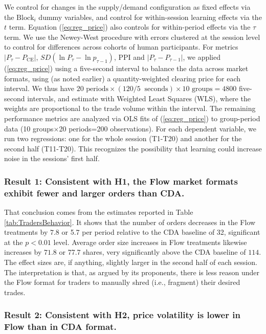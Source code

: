 \documentclass[12pt]{article}
\begin{document}
We control for changes in the supply/demand configuration as fixed effects via the $\text{Block}_i$ dummy variables,
and control for within-session learning effects via the $t$ term.
Equation (\ref{eq:reg_price}) also controls for within-period effects via the $\tau$ term. 
We use the Newey-West procedure with errors clustered at the session level to control for differences across cohorts of human participants.
For metrics $\lvert P_{\tau} - P_{\text{CE}}\rvert$, $SD\left(\ln P_{\tau} - \ln p_{{\tau} - 1}\right)$, PPI and $\lvert P_{{\tau}} - P_{{\tau} - 1}\rvert$, we applied (\ref{eq:reg_price}) using a five-second interval to balance the data across market formats, using (as noted earlier) a quantity-weighted clearing price for each interval. %
We thus have $20 \text{ periods} \times (120  / 5 \ \text{  seconds}) \times 10 \text{ groups}= 4800$ five-second intervals, and 
estimate with Weighted Least Squares (WLS), where the weights are proportional to the trade volume within the interval. 
The remaining performance metrics are analyzed via OLS fits of (\ref{eq:reg_price}) to group-period data (10 groups×20 periods=200 observations). 
For each dependent variable, we run two regressions: one for the whole session (T1-T20) and another for the second half (T11-T20). 
This recognizes the possibility that learning could increase noise in the sessions' first half. 


\subsubsection*{Result 1: 
Consistent with H1, the Flow market formats exhibit fewer and larger orders than CDA.}

That conclusion comes from the estimates reported in Table \ref{tab:TradersBehavior}.
It shows that the number of orders decreases in the Flow treatments by $7.8$ or 5.7 per period relative to the CDA baseline of 32, significant at the $p<0.01$ level. 
Average order size increases in Flow treatments likewise increases by $71.8$ or 77.7 shares, very significantly above the CDA baseline of $114$. 
The effect sizes are, if anything, slightly larger in the second half of each session. 
The interpretation is that, as argued by its proponents, there is less reason under the Flow format for traders to manually shred (i.e., fragment) their desired trades.

\subsubsection*{Result 2: Consistent with H2, price volatility is lower in Flow than in CDA format.}
\end{document}
